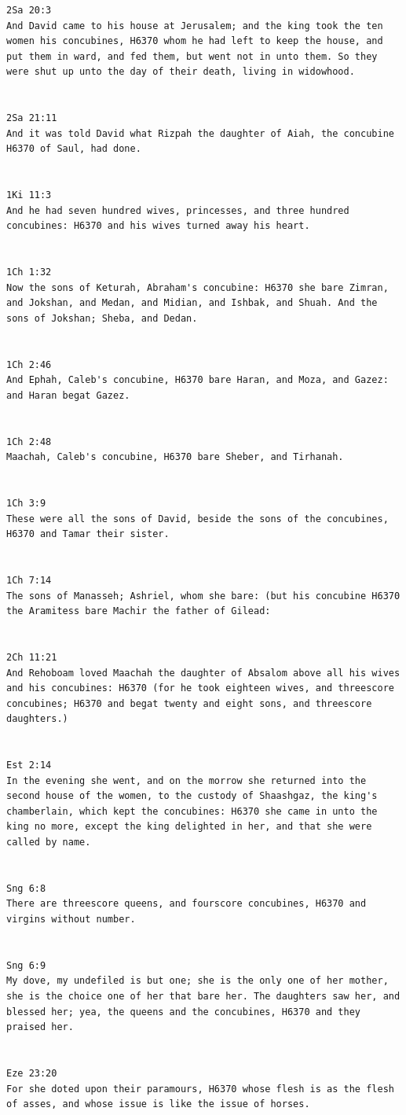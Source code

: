 \documentclass[11pt]{article}
\begin{document}
\begin{lstlisting}
2Sa 20:3
And David came to his house at Jerusalem; and the king took the ten women his concubines, H6370 whom he had left to keep the house, and put them in ward, and fed them, but went not in unto them. So they were shut up unto the day of their death, living in widowhood.


2Sa 21:11
And it was told David what Rizpah the daughter of Aiah, the concubine H6370 of Saul, had done.


1Ki 11:3
And he had seven hundred wives, princesses, and three hundred concubines: H6370 and his wives turned away his heart.


1Ch 1:32
Now the sons of Keturah, Abraham's concubine: H6370 she bare Zimran, and Jokshan, and Medan, and Midian, and Ishbak, and Shuah. And the sons of Jokshan; Sheba, and Dedan.


1Ch 2:46
And Ephah, Caleb's concubine, H6370 bare Haran, and Moza, and Gazez: and Haran begat Gazez.


1Ch 2:48
Maachah, Caleb's concubine, H6370 bare Sheber, and Tirhanah.


1Ch 3:9
These were all the sons of David, beside the sons of the concubines, H6370 and Tamar their sister.


1Ch 7:14
The sons of Manasseh; Ashriel, whom she bare: (but his concubine H6370 the Aramitess bare Machir the father of Gilead:


2Ch 11:21
And Rehoboam loved Maachah the daughter of Absalom above all his wives and his concubines: H6370 (for he took eighteen wives, and threescore concubines; H6370 and begat twenty and eight sons, and threescore daughters.)


Est 2:14
In the evening she went, and on the morrow she returned into the second house of the women, to the custody of Shaashgaz, the king's chamberlain, which kept the concubines: H6370 she came in unto the king no more, except the king delighted in her, and that she were called by name.


Sng 6:8
There are threescore queens, and fourscore concubines, H6370 and virgins without number.


Sng 6:9
My dove, my undefiled is but one; she is the only one of her mother, she is the choice one of her that bare her. The daughters saw her, and blessed her; yea, the queens and the concubines, H6370 and they praised her.


Eze 23:20
For she doted upon their paramours, H6370 whose flesh is as the flesh of asses, and whose issue is like the issue of horses.
\end{lstlisting}
\end{document}

